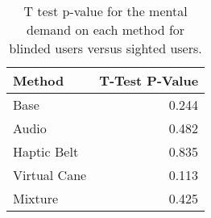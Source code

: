 
\begin{table}[!htb]
\centering
\caption{T test p-value for the mental demand on each method for blinded users versus sighted users.}
\label{tab:ttest_mental_demand}
\begin{tabular}{lr}
\toprule
      Method &  T-Test P-Value \\
\midrule
        Base &           0.244 \\
       Audio &           0.482 \\
 Haptic Belt &           0.835 \\
Virtual Cane &           0.113 \\
     Mixture &           0.425 \\
\bottomrule
\end{tabular}
\end{table}

